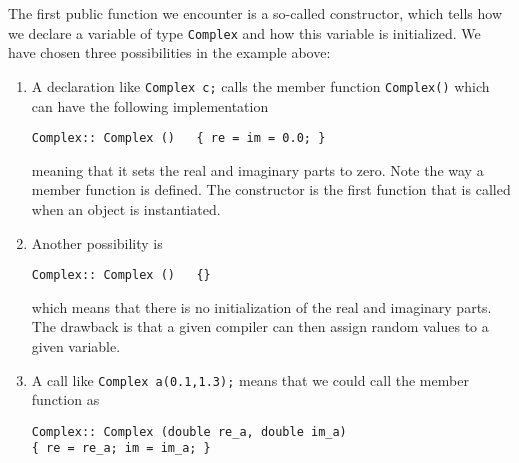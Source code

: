 The first public function we encounter is a so-called   
constructor, which  tells how we declare a variable of type \verb?Complex? 
and how this variable is initialized. We have chosen  three possibilities in the example above:
\begin{enumerate}
\item A declaration like \verb?Complex c;? calls the member function \verb?Complex()?
which can have the following implementation 
\begin{lstlisting}
Complex:: Complex ()   { re = im = 0.0; }
\end{lstlisting}
meaning that it sets the real and imaginary parts to zero.  Note the way a member function is defined.
The constructor is the first function that is called when an object is instantiated.
\item Another possibility  is 
\begin{lstlisting}
Complex:: Complex ()   {}
\end{lstlisting}
which means that there is no initialization of the real and imaginary parts.  The drawback is that a given compiler
can then assign random values to a given variable.
\item  A call like \verb?Complex a(0.1,1.3);? means that we could call the member function 
as
\begin{lstlisting}
Complex:: Complex (double re_a, double im_a)
{ re = re_a; im = im_a; }
\end{lstlisting}
\end{enumerate}


